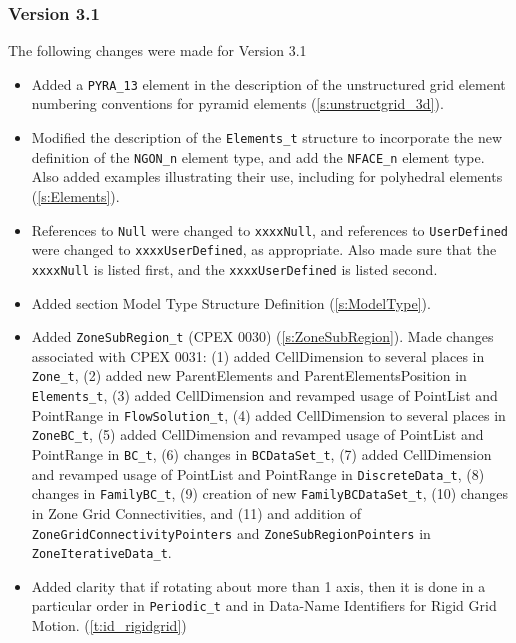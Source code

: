 \subsubsection{Version 3.1}
The following changes were made for Version 3.1

\begin{itemize}
\item Added a \texttt{PYRA\_13} element in the description of the unstructured grid 
      element numbering conventions for pyramid elements
      (\autoref{s:unstructgrid_3d}).
\item Modified the description of the \texttt{Elements\_t} structure to incorporate 
      the new definition of the \texttt{NGON\_n} element type, and add the 
      \texttt{NFACE\_n} element type. Also added examples illustrating their use, 
      including for polyhedral elements
      (\autoref{s:Elements}).
\item References to \texttt{Null} were changed to \texttt{xxxxNull}, and references to 
      \texttt{UserDefined} were changed to \texttt{xxxxUserDefined}, as appropriate. 
      Also made sure that the \texttt{xxxxNull} is listed first, and the 
      \texttt{xxxxUserDefined} is listed second.
\item Added section Model Type Structure Definition
      (\autoref{s:ModelType}).
\item Added \texttt{ZoneSubRegion\_t} (CPEX 0030) (\autoref{s:ZoneSubRegion}). 
      Made changes associated with CPEX 
      0031: (1) added CellDimension to several places in \texttt{Zone\_t}, (2) added 
      new ParentElements and ParentElementsPosition in \texttt{Elements\_t}, 
      (3) added CellDimension and revamped usage of PointList and PointRange in 
      \texttt{FlowSolution\_t}, (4) added CellDimension to several places in 
      \texttt{ZoneBC\_t}, (5) added CellDimension and revamped usage of PointList 
      and PointRange in \texttt{BC\_t}, (6) changes in \texttt{BCDataSet\_t}, 
      (7) added CellDimension and revamped usage of PointList and PointRange in 
      \texttt{DiscreteData\_t}, (8) changes in \texttt{FamilyBC\_t}, (9) creation 
      of new \texttt{FamilyBCDataSet\_t}, (10) changes in Zone Grid Connectivities, 
      and (11) and addition of \texttt{ZoneGridConnectivityPointers} and 
      \texttt{ZoneSubRegionPointers} in \texttt{ZoneIterativeData\_t}. 
\item Added clarity that if rotating about more than 1 axis, then it is done in a 
      particular order in \texttt{Periodic\_t} and in Data-Name Identifiers for 
      Rigid Grid Motion. 
      (\autoref{t:id_rigidgrid})
\end{itemize}
